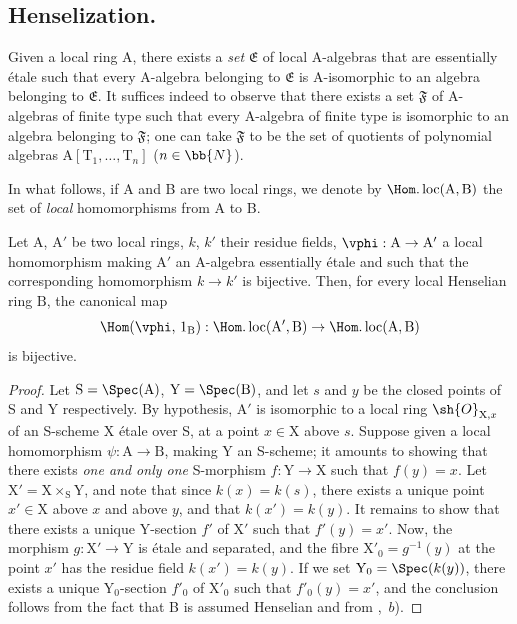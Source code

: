\subsection{Henselization.}
\label{subsection:IV.18.6}


\begin{env}[18.6.1]
\label{IV.18.6.1}
Given a local ring A, there exists a \emph{set} $\mathfrak{E}$ of local A-algebras that are essentially \'{e}tale such that every A-algebra belonging to $\mathfrak{E}$ is A-isomorphic to an algebra belonging to $\mathfrak{E}$.
It suffices indeed to observe that there exists a set $\mathfrak{F}$ of A-algebras of finite type such that every A-algebra of finite type is isomorphic to an algebra belonging to $\mathfrak{F}$; one can take $\mathfrak{F}$ to be the set of quotients of polynomial algebras $\mathrm{A}[\mathrm{T}_1,\ldots,\mathrm{T}_n]$ ($n\in\bb{N}$).

In what follows, if A and B are two local rings, we denote by $\Hom.\operatorname{loc}(\mathrm{A},\mathrm{B})$ the set of \emph{local} homomorphisms from A to B.
\end{env}

\begin{lemma}[18.6.2]
\label{IV.18.6.2}
Let $\mathrm{A}$, $\mathrm{A}'$ be two local rings, $k$, $k'$ their residue fields,
$\vphi:\mathrm{A}\to\mathrm{A}'$ a local homomorphism making $\mathrm{A}'$ an A-algebra essentially \'{e}tale 
and such that the corresponding homomorphism $k\to k'$ is bijective.
Then, for every local Henselian ring $\mathrm{B}$, the canonical map
\[
  \Hom(\vphi,\,1_{\mathrm{B}}):\Hom.\operatorname{loc}(\mathrm{A}',\mathrm{B})\to\Hom.\operatorname{loc}(\mathrm{A},\mathrm{B})
\]
is bijective.
\end{lemma}

\begin{proof}
Let $\mathrm{S}=\Spec(\mathrm{A})$, $\mathrm{Y}=\Spec(\mathrm{B})$, and let $s$ and $y$ be the closed points of S and Y respectively.
By hypothesis, $\mathrm{A}'$ is isomorphic to a local ring $\sh{O}_{\mathrm{X},x}$ of an S-scheme X \'{e}tale over S, at a point $x\in\mathrm{X}$ above $s$.
Suppose given a local homomorphism $\psi:\mathrm{A}\to\mathrm{B}$, making Y an S-scheme;
it amounts to showing that there exists \emph{one and only one} S-morphism $f:\mathrm{Y}\to\mathrm{X}$ such that $f(y)=x$.
Let $\mathrm{X}'=\mathrm{X}\times_{\mathrm{S}}\mathrm{Y}$, and note that since $k(x)=k(s)$, there exists a unique point $x'\in\mathrm{X}$ above $x$ and above $y$, and that $k(x')=k(y)$.
It remains to show that there exists a unique Y-section $f'$ of $\mathrm{X}'$ such that $f'(y)=x'$.
Now, the morphism $g:\mathrm{X}'\to\mathrm{Y}$ is \'{e}tale and separated, and the fibre $\mathrm{X}'_0=g^{-1}(y)$ at the point $x'$ has the residue field $k(x')=k(y)$.
If we set $\mathrm{Y}_0=\Spec(k(y))$, there exists a unique $\mathrm{Y}_0$-section $f'_0$ of $\mathrm{X}'_0$ such that $f'_0(y)=x'$, and the conclusion follows from the fact that B is assumed Henselian and from ,~$b$).
\end{proof}

